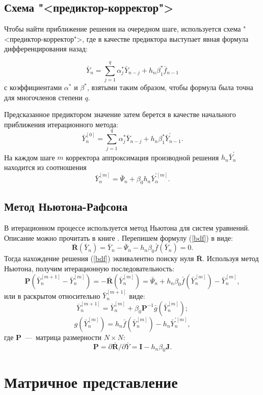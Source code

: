 \documentclass[oneside,final,14pt]{extreport}
\begin{document}
\subsection{Схема "<предиктор-корректор">}
Чтобы найти приближение решения на очередном шаге, используется схема "<предиктор-корректор">, где в качестве предиктора выступает явная формула дифференцирования назад:

\[\bar Y_n=\sum_{j=1}^{q} \alpha_j^*\bar Y_{n-j}+h_n\beta_1^*\bar f_{n-1}\]
с коэффициентами \(\alpha^*\) и \(\beta^*\), взятыми таким образом, чтобы формула была точна для многочленов степени \(q\).

Предсказанное предиктором значение затем берется в качестве начального приближения итерационного метода:
\[\bar Y_n^{[0]}=\sum_{j=1}^{q} \alpha_j^*\bar Y_{n-j}+h_n\beta_1^*\bar Y_{n-1}^{'}.\]
 На каждом шаге \(m\) корректора аппроксимация производной решения \(h_n\bar Y_n^{'}\) находится из соотношения
\begin{equation}
\bar Y_n^{[m]}=\bar\Psi_n+\beta_0 h_n\bar Y_n^{'[m]}.
\end{equation}

\subsection{Метод Ньютона-Рафсона}
В итерационном процессе используется метод Ньютона для систем уравнений. Описание можно прочитать в книге \cite{andreev}. Перепишем формулу (\ref{bdf}) в виде:
\[
\mathbf{\bar R}(\bar Y_n)= \bar Y_n-\bar\Psi_n-h_n\beta_0\bar f(\bar Y_n)=0.
\]
Тогда нахождение решения (\ref{bdf}) эквивалентно поиску нуля \(\mathbf{\bar R}\). Используя метод Ньютона, получим итерационную последовательность:
\[
\mathbf P(\bar Y_n^{[m+1]}-\bar Y_n^{[m]})=-\mathbf{\bar R}(\bar Y_n^{[m]})=\bar\Psi_n+h_n\beta_0\bar f(\bar Y_n^{[m]})-\bar Y_n^{[m]}
,\]
или в раскрытом относительно \(\bar Y_n^{[m+1]}\) виде:
\begin{equation}
\label{newton}
\bar Y_n^{[m+1]}=\bar Y_n^{[m]}+\beta_0\mathbf P^{-1}\bar g(\bar Y_n^{[m]});
\end{equation}
\[
g(\bar Y_n^{[m]})=h_n\bar f(\bar Y_n^{[m]})-h_n\bar Y_n^{'[m]},
\]
где \(\mathbf P\)~---~матрица размерности \(N\times N\):
\[
\mathbf P=\partial\mathbf{\bar R} / \partial\bar Y=\mathbf I-h_n\beta_0 \mathbf J.
\]


\section{Матричное представление}
\end{document}
